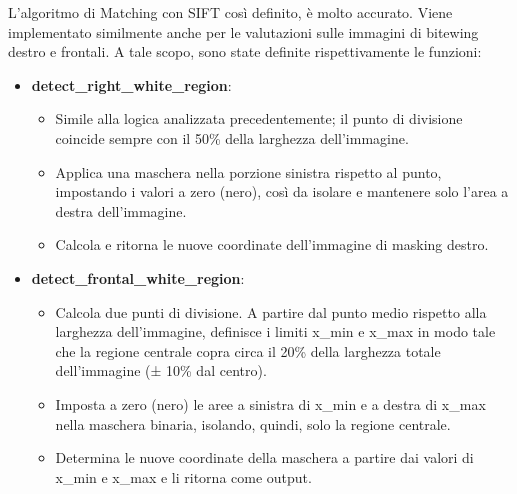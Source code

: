 \documentclass[12pt,a4paper,openright,twoside]{book}
\begin{document}
L'algoritmo di Matching con SIFT così definito, è molto accurato. Viene implementato similmente anche per le valutazioni sulle immagini di bitewing destro e frontali. A tale scopo, sono state definite rispettivamente le funzioni:
\begin{itemize}
\item \textbf{detect\_right\_white\_region}:
\begin{itemize}
\item Simile alla logica analizzata precedentemente; il punto di divisione coincide sempre con il 50\% della larghezza dell'immagine.
\item Applica una maschera nella porzione sinistra rispetto al punto, impostando i valori a zero (nero), così da isolare e mantenere solo l'area a destra dell'immagine.
\item Calcola e ritorna le nuove coordinate dell'immagine di masking destro.
\end{itemize}

\item \textbf{detect\_frontal\_white\_region}:
\begin{itemize}
\item Calcola due punti di divisione. A partire dal punto medio rispetto alla larghezza dell'immagine, definisce i limiti x\_min e x\_max in modo tale che la regione centrale copra circa il 20\% della larghezza totale dell'immagine (± 10\% dal centro).
\item Imposta a zero (nero) le aree a sinistra di x\_min e a destra di x\_max nella maschera binaria, isolando, quindi, solo la regione centrale.
\item Determina le nuove coordinate della maschera a partire dai valori di x\_min e x\_max e li ritorna come output.
\end{itemize}
\end{itemize}
\end{document}
